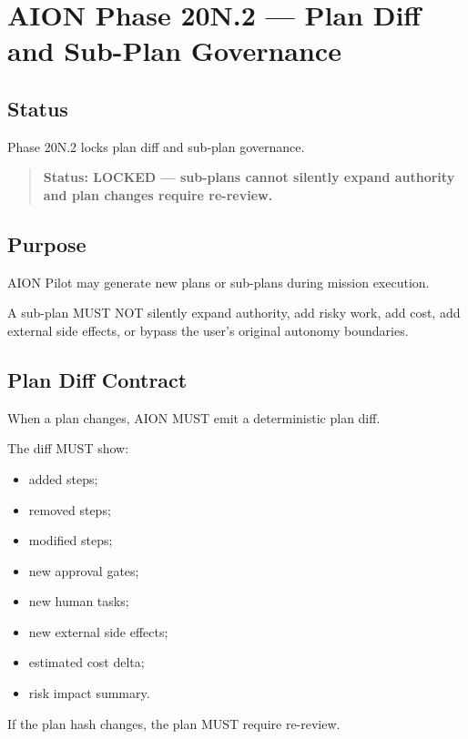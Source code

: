 \section{AION Phase 20N.2 --- Plan Diff and Sub-Plan Governance}
\label{sec:aion-phase20n2-plan-diff-subplan-governance}

\subsection{Status}

Phase 20N.2 locks plan diff and sub-plan governance.

\begin{quote}
\textbf{Status: LOCKED --- sub-plans cannot silently expand authority and plan changes require re-review.}
\end{quote}

\subsection{Purpose}

AION Pilot may generate new plans or sub-plans during mission execution.

A sub-plan MUST NOT silently expand authority, add risky work, add cost, add external side effects, or bypass the user's original autonomy boundaries.

\subsection{Plan Diff Contract}

When a plan changes, AION MUST emit a deterministic plan diff.

The diff MUST show:

\begin{itemize}
  \item added steps;
  \item removed steps;
  \item modified steps;
  \item new approval gates;
  \item new human tasks;
  \item new external side effects;
  \item estimated cost delta;
  \item risk impact summary.
\end{itemize}

If the plan hash changes, the plan MUST require re-review.


